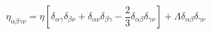 \documentclass[12pt]{article}
\begin{document}
$$ 
\eta_{\alpha \beta \gamma \nu} = \eta\left[\delta_{\alpha \gamma}\delta_{\beta \nu} + \delta_{\alpha \nu}\delta_{\beta \gamma} - \frac{2}{3}\delta_{\alpha \beta}\delta_{\gamma \nu}\right] + \Lambda \delta_{\alpha \beta}\delta_{\gamma \nu}
$$
\end{document}
